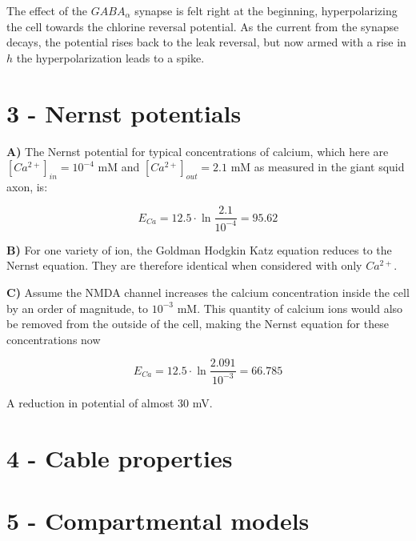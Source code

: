 \documentclass[12pt]{article}
\begin{document}
The effect of the $GABA_\alpha$ synapse is felt right at the beginning, hyperpolarizing the cell towards the chlorine reversal potential.  As the current from the synapse decays, the potential rises back to the leak reversal, but now armed with a rise in $h$ the hyperpolarization leads to a spike.

\section{3 - Nernst potentials}

{\bf A)}  The Nernst potential for typical concentrations of calcium, which here are $[Ca^{2+}]_{in}=10^{-4}$ mM and $[Ca^{2+}]_{out}=2.1$ mM as measured in the giant squid axon, is:

$$ E_{Ca}=12.5\cdot\ln\frac{2.1}{10^{-4}}=95.62 $$

{\bf B)}  For one variety of ion, the Goldman Hodgkin Katz equation reduces to the Nernst equation.  They are therefore identical when considered with only $Ca^{2+}$.

{\bf C)}  Assume the NMDA channel increases the calcium concentration inside the cell by an order of magnitude, to $10^{-3}$ mM.  This quantity of calcium ions would also be removed from the outside of the cell, making the Nernst equation for these concentrations now

$$ E_{Ca}=12.5\cdot\ln\frac{2.091}{10^{-3}}=66.785 $$

A reduction in potential of almost 30 mV.

\section{4 - Cable properties}



\section{5 - Compartmental models}
\end{document}
